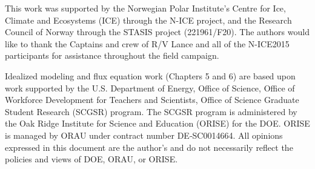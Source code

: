 This work was supported by the Norwegian Polar Institute's Centre for Ice, Climate and Ecosystems (ICE) through the N-ICE project, and the Research Council of Norway through the STASIS project (221961/F20). The authors would like to thank the Captains and crew of R/V Lance and all of the N-ICE2015 participants for assistance throughout the field campaign.



Idealized modeling and flux equation work (Chapters 5 and 6) are based upon work supported by the U.S. Department of Energy, Office of Science, Office of Workforce Development for Teachers and Scientists, Office of Science Graduate Student Research (SCGSR) program. The SCGSR program is administered by the Oak Ridge Institute for Science and Education (ORISE) for the DOE. ORISE is managed by ORAU under contract number DE‐SC0014664. All opinions expressed in this document are the author’s and do not necessarily reflect the policies and views of DOE, ORAU, or ORISE.

